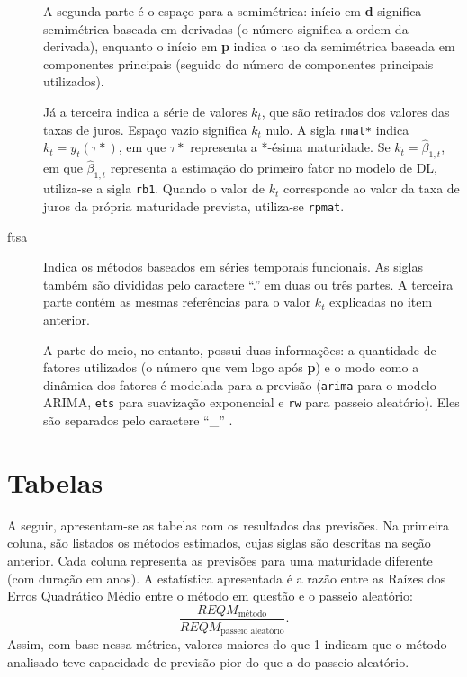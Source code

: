 \documentclass[
	12pt,				%
	openright,			%
	oneside,			%
	a4paper,			%
	english,			%
	brazil				%
	]{dissertacao-ufrgs-abntex2}
\begin{document}
\begin{apendicesenv}
\begin{description}
	A segunda parte é o espaço para a semimétrica: início em \textbf{d} significa semimétrica baseada em derivadas (o número significa a ordem da derivada), enquanto o início em \textbf{p} indica o uso da semimétrica baseada em componentes principais (seguido do número de componentes principais utilizados). 
	
	Já a terceira indica a série de valores $k_t$, que são retirados dos valores das taxas de juros. Espaço vazio significa $k_t$ nulo. A sigla \texttt{rmat*} indica $k_t = y_t(\tau*)$, em que $\tau*$ representa a *-ésima maturidade. Se $k_t = \hat{\beta}_{1,t}$, em que $\hat{\beta}_{1,t}$ representa a estimação do primeiro fator no modelo de DL, utiliza-se a sigla \texttt{rb1}. Quando o valor de $k_t$ corresponde ao valor da taxa de juros da própria maturidade prevista, utiliza-se \texttt{rpmat}.

	\item[ftsa] Indica os métodos baseados em séries temporais funcionais. As siglas também são divididas pelo caractere ``.'' em duas ou três partes. A terceira parte contém as mesmas referências para o valor $k_t$ explicadas no item anterior.
	
A parte do meio, no entanto, possui duas informações: a quantidade de fatores utilizados (o número que vem logo após \textbf{p}) e o modo como a dinâmica dos fatores é modelada para a previsão (\texttt{arima} para o modelo ARIMA, \texttt{ets} para suavização exponencial e \texttt{rw} para passeio aleatório). Eles são separados pelo caractere ``\_'' .

\end{description}

\section{Tabelas} \label{apend:tabelas}

A seguir, apresentam-se as tabelas com os resultados das previsões. Na primeira coluna, são listados os métodos estimados, cujas siglas são descritas na seção anterior. Cada coluna representa as previsões para uma maturidade diferente (com duração em anos). A estatística apresentada é a razão entre as Raízes dos Erros Quadrático Médio entre o método em questão e o passeio aleatório:
\[
\dfrac{REQM_{\text{método}}}{REQM_{\text{passeio aleatório}}}.
\]
Assim, com base nessa métrica, valores maiores do que 1 indicam que o método analisado teve capacidade de previsão pior do que a do passeio aleatório.


\end{apendicesenv}

\end{document}
